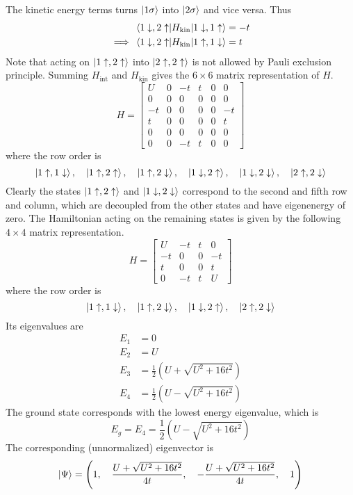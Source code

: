 \documentclass[12pt,a4paper,titlepage]{article}
\newcommand{\trm}[1]{\textrm{#1}} %
\newcommand{\up}{\uparrow} %
\newcommand{\dn}{\downarrow} %
\begin{document}
The kinetic energy terms turns $\ket{1\sigma}$ into $\ket{2\sigma}$ and vice versa. Thus
\begin{equation}
\begin{aligned}
\mel{1\dn,2\up}{H_{\trm{kin}}}{1\dn,1\up}&=-t\\
\implies\mel{1\dn,2\up}{H_{\trm{kin}}}{1\up,1\dn}&=t
\end{aligned}
\end{equation}
Note that acting on $\ket{1\up,2\up}$ into $\ket{2\up,2\up}$ is not allowed by Pauli exclusion principle. Summing $H_{\trm{int}}$ and $H_{\trm{kin}}$ gives the $6\times6$ matrix representation of $H$.
\begin{equation}
H=\begin{bmatrix}
U & 0 & -t & t & 0 & 0\\
0 & 0 & 0 & 0 & 0 & 0\\
-t & 0 & 0 & 0 & 0 & -t\\
t & 0 & 0 & 0 & 0 & t\\
0 & 0 & 0 & 0 & 0 & 0\\
0 & 0 & -t & t & 0 & 0
\end{bmatrix}
\end{equation}
where the row order is
\[
\ket{1\up,1\dn},\quad\ket{1\up,2\up},\quad\ket{1\up,2\dn},\quad\ket{1\dn,2\up},\quad\ket{1\dn,2\dn},\quad\ket{2\up,2\dn}
\]
Clearly the states $\ket{1\up,2\up}$ and $\ket{1\dn,2\dn}$ correspond to the second and fifth row and column, which are decoupled from the other states and have eigenenergy of zero. The Hamiltonian acting on the remaining states is given by the following $4\times4$ matrix representation.
\begin{equation}
H=\begin{bmatrix}
U & -t & t & 0\\
-t & 0 & 0 & -t\\
t & 0 & 0 & t\\
0 & -t & t & U
\end{bmatrix}
\end{equation}
where the row order is
\[
\ket{1\up,1\dn},\quad\ket{1\up,2\dn},\quad\ket{1\dn,2\up},\quad\ket{2\up,2\dn}
\]
Its eigenvalues are
\begin{equation}
\begin{aligned}
E_{1}&=0\\
E_{2}&=U\\
E_{3}&=\frac{1}{2}\left(U+\sqrt{U^{2}+16t^{2}}\right)\\
E_{4}&=\frac{1}{2}\left(U-\sqrt{U^{2}+16t^{2}}\right)
\end{aligned}
\end{equation}
The ground state corresponds with the lowest energy eigenvalue, which is
\begin{equation}
E_{g}=E_{4}=\frac{1}{2}\left(U-\sqrt{U^{2}+16t^{2}}\right)
\end{equation}
The corresponding (unnormalized) eigenvector is
\begin{equation}
\ket{\Psi}=\left(1,\quad\frac{U+\sqrt{U^{2}+16t^{2}}}{4t},\quad-\frac{U+\sqrt{U^{2}+16t^{2}}}{4t},\quad1\right)
\end{equation}
\end{document}
